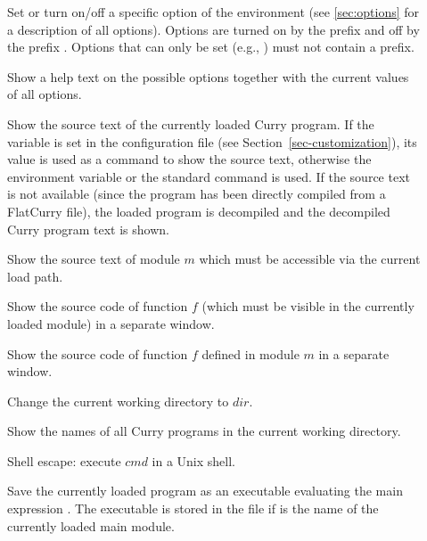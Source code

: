 \begin{description}
\item[]
Set or turn on/off a specific option
of the \CYS environment (see \ref{sec:options} for a description
of all options). Options are turned on by the prefix
\ccode{+} and off by the prefix \ccode{-}. Options that can only
be set (e.g., ) must not contain a prefix.

\item[]
Show a help text on the possible options
together with the current values of all options.

\item[]
Show the source text of the currently loaded Curry program.
If the variable  is set in the
configuration file 
(see Section~\ref{sec-customization}),
its value is used as a command to show the source text,
otherwise the environment variable  or the standard command
 is used.
If the source text is not available
(since the program has been directly compiled from a FlatCurry
file), the loaded program is decompiled and
the decompiled Curry program text is shown.

\item[]
Show the source text of module $m$ which must be accessible
via the current load path.

\item[]
Show the source code of function $f$ (which must be visible
in the currently loaded module) in a separate window.

\item[]
Show the source code of function $f$ defined in module $m$
in a separate window.

\item[]
Change the current working directory to $dir$.

\item[] Show the names of all Curry programs
in the current working directory.

\item[] Shell escape: execute $cmd$ in a Unix shell.

\item[] Save the currently loaded
program as an executable evaluating the main expression .
The executable is stored in the file 
if  is the name of the currently loaded main module.


\end{description}
